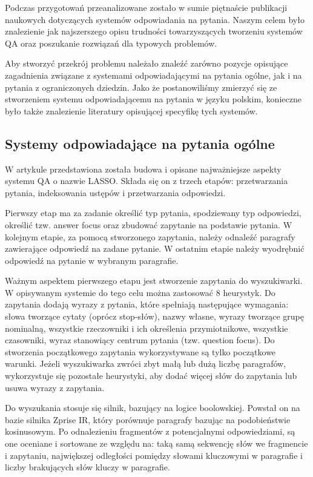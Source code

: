 
Podczas przygotowań przeanalizowane zostało w sumie piętnaście publikacji naukowych dotyczących systemów odpowiadania na pytania. Naszym celem było znalezienie jak najszerszego opisu trudności towarzyszących tworzeniu systemów QA oraz poszukanie rozwiązań dla typowych problemów. 

Aby stworzyć przekrój problemu należało znaleźć zarówno pozycje opisujące zagadnienia związane z systemami odpowiadającymi na pytania ogólne, jak i na pytania z ograniczonych dziedzin. Jako że postanowiliśmy zmierzyć się ze stworzeniem systemu odpowiadającemu na pytania w języku polskim, konieczne było także znalezienie literatury opisującej specyfikę tych systemów.

\subsection{Systemy odpowiadające na pytania ogólne}\label{subsec:lit:op}

W artykule \cite{moldovan-etal-2000-structure} przedstawiona została budowa i opisane najważniejsze aspekty systemu QA o nazwie LASSO. Składa się on z trzech etapów: przetwarzania pytania, indeksowania ustępów i przetwarzania odpowiedzi. 

Pierwszy etap ma za zadanie określić typ pytania, spodziewany typ odpowiedzi, określić tzw. answer focus oraz zbudować zapytanie na podstawie pytania. W kolejnym etapie, za pomocą stworzonego zapytania,  należy odnaleźć paragrafy zawierające odpowiedź na zadane pytanie. W ostatnim etapie należy wyodrębnić odpowiedź na pytanie w wybranym paragrafie.

Ważnym aspektem pierwszego etapu jest stworzenie zapytania do wyszukiwarki. W opisywanym systemie do tego celu można zastosować 8 heurystyk. Do zapytania dodają wyrazy z pytania, które spełniają następujące wymagania: słowa tworzące cytaty (oprócz stop-słów), nazwy własne, wyrazy tworzące grupę nominalną, wszystkie rzeczowniki i ich określenia przymiotnikowe, wszystkie czasowniki, wyraz stanowiący centrum pytania (tzw. question focus). Do stworzenia początkowego zapytania wykorzystywane są tylko początkowe warunki. Jeżeli wyszukiwarka zwróci zbyt małą lub dużą liczbę paragrafów, wykorzystuje się pozostałe heurystyki, aby dodać więcej słów do zapytania lub usuwa wyrazy z zapytania. 

Do wyszukania stosuje się silnik, bazujący na logice boolowskiej.  Powstał on na bazie silnika Zprise IR, który porównuje paragrafy bazując na podobieństwie kosinusowym. Po odnalezieniu fragmentów z potencjalnymi odpowiedziami, są one oceniane i sortowane ze względu na: taką samą sekwencję słów we fragmencie i zapytaniu, największej odległości pomiędzy słowami kluczowymi w paragrafie i liczby brakujących słów kluczy w paragrafie. 

